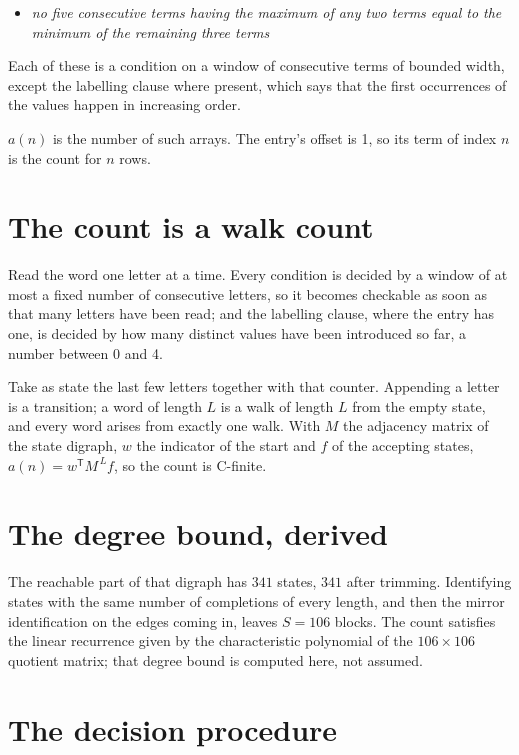 \documentclass[11pt]{article}
\theoremstyle{definition}
\begin{document}
\begin{itemize}

\item {\itshape no five consecutive terms having the maximum of any two terms equal to the minimum of the remaining three terms}

\end{itemize}

Each of these is a condition on a window of consecutive terms of bounded width, except the labelling clause where present, which says that the first occurrences of the values happen in increasing order.

$a(n)$ is the number of such arrays. The entry's offset is 1, so its term of index $n$ is the count for $n$ rows.

\section{The count is a walk count}

Read the word one letter at a time. Every condition is decided by a window of at most a fixed number of consecutive letters, so it becomes checkable as soon as that many letters have been read; and the labelling clause, where the entry has one, is decided by how many distinct values have been introduced so far, a number between $0$ and 4.

Take as state the last few letters together with that counter. Appending a letter is a transition; a word of length $L$ is a walk of length $L$ from the empty state, and every word arises from exactly one walk. With $M$ the adjacency matrix of the state digraph, $w$ the indicator of the start and $f$ of the accepting states, $a(n) = w^{\mathsf T}M^{\,L}f$, so the count is C-finite.

\section{The degree bound, derived}

The reachable part of that digraph has $341$ states, $341$ after trimming. Identifying states with the same number of completions of every length, and then the mirror identification on the edges coming in, leaves $S = 106$ blocks. The count satisfies the linear recurrence given by the characteristic polynomial of the $106\times106$ quotient matrix; that degree bound is computed here, not assumed.

\section{The decision procedure}
\end{document}
